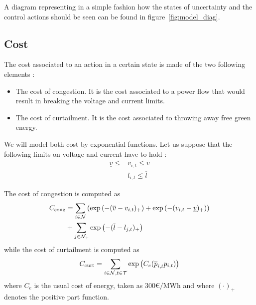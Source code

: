 A diagram representing in a simple fashion how the states of uncertainty
and the control actions should be seen can be found in figure~\ref{fig:model_diag}.

\subsection{Cost}
The cost associated to an action in a certain state is made of the two following elements :
\begin{itemize}
  \item The cost of congestion. It is the cost associated to a power flow that would result in breaking the voltage and current limits.
  \item The cost of curtailment. It is the cost associated to throwing away free green energy.
\end{itemize}

We will model both cost by exponential functions.
Let us suppose that the following limits on voltage and current have to hold :
\begin{align*}
  \underline{v} \le &v_{i,t} \le \overline{v}\\
  &l_{i,t} \le \overline{l}
\end{align*}

The cost of congestion is computed as
\begin{align*}
  C_{\text{cong}} &= \sum_{i \in \mathcal{N}} \left( \exp{\left(-(\overline{v}-v_{i,t})_+\right)} + \exp{\left(-(v_{i,t}-\underline{v})_+\right)} \right)  \\
  &+ \sum_{j \in \mathcal{N}_+} \exp{\left(-(\overline{l}-l_{j,t})_+\right)}
\end{align*}
while the cost of curtailment is computed as
\[
  C_{\text{curt}} = \sum_{i \in \mathcal{N},t \in \mathcal{T}} \exp{\left(C_e(\overline{p}_{i,t}p_{i,t})\right)}
\]
where $C_e$ is the usual cost of energy, taken as $300\si{\euro\per\mega\watt\hour}$ and where $(\cdot)_+$ denotes the positive part function.

